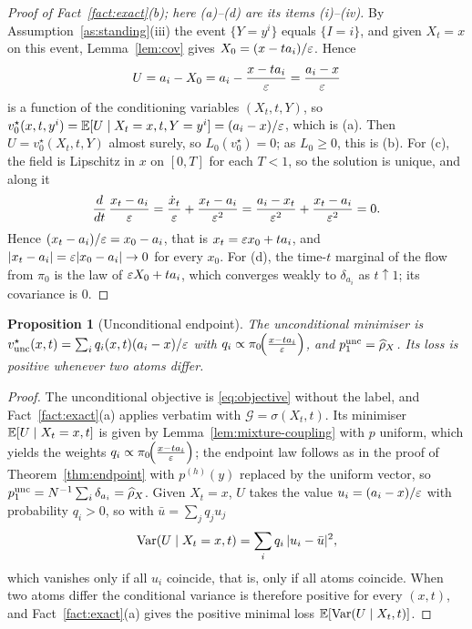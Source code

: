 \documentclass{article} %
\theoremstyle{plain}
\newtheorem{proposition}[theorem]{Proposition}
\theoremstyle{definition}
\theoremstyle{remark}
\begin{document}
\label{apx:pf-collapse}
\begin{proof}[Proof of Fact~\ref{fact:exact}(b); here (a)--(d) are its items (i)--(iv)]
By Assumption~\ref{as:standing}(iii) the event $\{Y=y^i\}$ equals $\{I=i\}$, and given $X_t=x$ on
this event, Lemma~\ref{lem:cov} gives $X_0=(x-ta_i)/\varepsilon$. Hence
\[
U=a_i-X_0=a_i-\frac{x-ta_i}{\varepsilon}=\frac{a_i-x}{\varepsilon}
\]
is a function of the conditioning variables $(X_t,t,Y)$, so
$v_0^\star(x,t,y^i)=\mathbb{E}[U\mid X_t=x,t,Y=y^i]=(a_i-x)/\varepsilon$, which is (a). Then
$U=v_0^\star(X_t,t,Y)$ almost surely, so $L_0(v_0^\star)=0$; as $L_0\ge0$, this is (b). For (c), the
field is Lipschitz in $x$ on $[0,T]$ for each $T<1$, so the solution is unique, and along it
\[
\frac{d}{dt}\,\frac{x_t-a_i}{\varepsilon}=\frac{\dot x_t}{\varepsilon}+\frac{x_t-a_i}{\varepsilon^2}
=\frac{a_i-x_t}{\varepsilon^2}+\frac{x_t-a_i}{\varepsilon^2}=0 .
\]
Hence $(x_t-a_i)/\varepsilon=x_0-a_i$, that is $x_t=\varepsilon x_0+ta_i$, and $|x_t-a_i|=\varepsilon|x_0-a_i|\to0$ for
every $x_0$. For (d), the time-$t$ marginal of the flow from $\pi_0$ is the law of
$\varepsilon X_0+ta_i$, which converges weakly to $\delta_{a_i}$ as $t\uparrow1$; its covariance is
$0$.
\end{proof}

\begin{proposition}[Unconditional endpoint]
\label{prop:uncond}
The unconditional minimiser is $v_{\mathrm{unc}}^\star(x,t)=\sum_iq_i(x,t)(a_i-x)/\varepsilon$ with
$q_i\propto\pi_0\!\Big(\frac{x-ta_{i}}{\varepsilon}\Big)$, and $p_1^{\mathrm{unc}}=\widehat{\rho}_X$. Its loss is positive whenever two atoms
differ.
\end{proposition}
\begin{proof}
\label{apx:pf-uncond}
The unconditional objective is \eqref{eq:objective} without the label, and
Fact~\ref{fact:exact}(a) applies verbatim with $\mathcal G=\sigma(X_t,t)$. Its minimiser
$\mathbb{E}[U\mid X_t=x,t]$ is given by Lemma~\ref{lem:mixture-coupling} with $p$ uniform, which yields
the weights $q_i\propto\pi_0\!\Big(\frac{x-ta_{i}}{\varepsilon}\Big)$; the endpoint law follows as in the proof of
Theorem~\ref{thm:endpoint} with $p^{(h)}(y)$ replaced by the uniform vector, so
$p_1^{\mathrm{unc}}=N^{-1}\sum_i\delta_{a_i}=\widehat{\rho}_X$. Given $X_t=x$, $U$ takes the value
$u_i=(a_i-x)/\varepsilon$ with probability $q_i>0$, so with $\bar u=\sum_jq_ju_j$
\[
\operatorname{Var}(U\mid X_t=x,t)=\sum_iq_i\,|u_i-\bar u|^2 ,
\]
which vanishes only if all $u_i$ coincide, that is, only if all atoms coincide. When two atoms
differ the conditional variance is therefore positive for every $(x,t)$, and
Fact~\ref{fact:exact}(a) gives the positive minimal loss
$\mathbb{E}[\operatorname{Var}(U\mid X_t,t)]$.
\end{proof}
\end{document}
